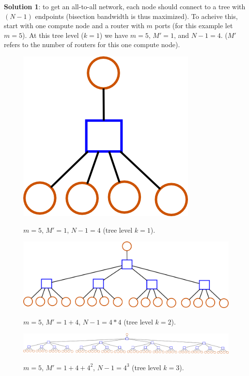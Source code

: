 \documentclass[pdftex]{article}
\begin{document}
\textbf{Solution 1}: to get an all-to-all network, each node should connect to a tree with $(N-1)$ endpoints (bisection bandwidth is thus maximized). To acheive this, start with one compute node and a router with $m$ ports (for this example let $m=5$). At this tree level ($k=1$) we have $m=5$, $M'=1$, and $N-1=4$. ($M'$ refers to the number of routers for this one compute node).

\begin{figure}[h!]
\begin{center}
\includegraphics[scale=0.3]{pictures/N5_n1_M1_m5_tree}
\label{fig:tree_k1}
 \caption{$m=5$, $M'=1$, $N-1=4$ (tree level $k=1$). }
\end{center}
\end{figure}

\begin{figure}[h!]
\begin{center}
\includegraphics[scale=0.3]{pictures/N17_n1_M5_m5_tree}
\label{fig:tree_k2}
 \caption{$m=5$, $M'=1+4$, $N-1=4*4$ (tree level $k=2$). }
\end{center}
\end{figure}


\begin{figure}[h!]
\begin{center}
\includegraphics[scale=0.3]{pictures/N65_n1_M21_m5_tree}
\label{fig:tree_k3}
 \caption{$m=5$, $M'=1+4+4^2$, $N-1=4^3$ (tree level $k=3$). }
\end{center}
\end{figure}
\end{document}
